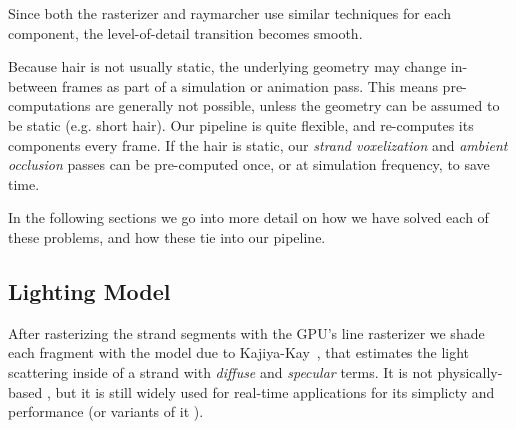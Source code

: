 \documentclass{egpubl}
\begin{document}
Since both the rasterizer and raymarcher use similar techniques for each component, the level-of-detail transition becomes smooth.


Because hair is not usually static, the underlying geometry may change in-between frames as part of a simulation or animation pass. This means pre-computations are generally not possible, unless the geometry can be assumed to be static (e.g. short hair). Our pipeline is quite flexible, and re-computes its components every frame. If the hair is static, our \emph{strand voxelization} and \emph{ambient occlusion} passes can be pre-computed once, or at simulation frequency, to save time.

In the following sections we go into more detail on how we have solved each of these problems, and how these tie into our pipeline.

\vspace{-0.8em}

\subsection{Lighting Model} \label{sec:lighting_model}


After rasterizing the strand segments with the GPU's line rasterizer we shade each fragment with the model due to Kajiya-Kay~\cite{kajiya1989rendering}, that estimates the light scattering inside of a strand with \emph{diffuse} and \emph{specular} terms. It is not physically-based \cite{marschner2003light, d2011energy}, but it is still widely used \cite{ward2007survey, yuksel2010advanced} for real-time applications for its simplicty and performance (or variants of it \cite{scheuermann2004practical, martin2014tressfx}).

\end{document}
